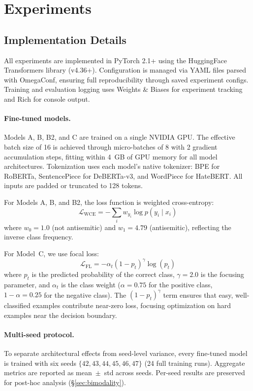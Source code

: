\section{Experiments}
\label{sec:experiments}

\subsection{Implementation Details}

All experiments are implemented in PyTorch 2.1+ using the HuggingFace Transformers library (v4.36+). Configuration is managed via YAML files parsed with OmegaConf, ensuring full reproducibility through saved experiment configs. Training and evaluation logging uses Weights \& Biases for experiment tracking and Rich for console output.

\paragraph{Fine-tuned models.}
Models A, B, B2, and C are trained on a single NVIDIA GPU. The effective batch size of 16 is achieved through micro-batches of 8 with 2 gradient accumulation steps, fitting within 4~GB of GPU memory for all model architectures. Tokenization uses each model's native tokenizer: BPE for RoBERTa, SentencePiece for DeBERTa-v3, and WordPiece for HateBERT. All inputs are padded or truncated to 128 tokens.

For Models A, B, and B2, the loss function is weighted cross-entropy:
\begin{equation}
    \mathcal{L}_{\text{WCE}} = -\sum_{i} w_{y_i} \log p(y_i \mid x_i)
\end{equation}
where $w_0 = 1.0$ (not antisemitic) and $w_1 = 4.79$ (antisemitic), reflecting the inverse class frequency.

For Model~C, we use focal loss:
\begin{equation}
    \mathcal{L}_{\text{FL}} = -\alpha_t (1 - p_t)^\gamma \log(p_t)
\end{equation}
where $p_t$ is the predicted probability of the correct class, $\gamma = 2.0$ is the focusing parameter, and $\alpha_t$ is the class weight ($\alpha = 0.75$ for the positive class, $1 - \alpha = 0.25$ for the negative class). The $(1-p_t)^\gamma$ term ensures that easy, well-classified examples contribute near-zero loss, focusing optimization on hard examples near the decision boundary.

\paragraph{Multi-seed protocol.}
To separate architectural effects from seed-level variance, every fine-tuned model is trained with six seeds $\{42, 43, 44, 45, 46, 47\}$ (24 full training runs). Aggregate metrics are reported as mean~$\pm$~std across seeds. Per-seed results are preserved for post-hoc analysis (\S\ref{sec:bimodality}).

